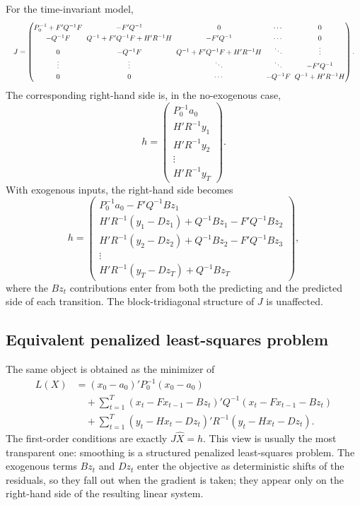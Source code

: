 \documentclass[11pt]{article}
\begin{document}
For the time-invariant model,
\begin{equation}
\resizebox{\textwidth}{!}{$
\renewcommand{\arraystretch}{1.25}
\setlength{\arraycolsep}{3pt}
J=\begin{pmatrix}
P_0^{-1}+F'Q^{-1}F & -F'Q^{-1} & 0 & \cdots & 0\\
-Q^{-1}F & Q^{-1}+F'Q^{-1}F+H'R^{-1}H & -F'Q^{-1} & \cdots & 0\\
0 & -Q^{-1}F & Q^{-1}+F'Q^{-1}F+H'R^{-1}H & \ddots & \vdots\\
\vdots & \vdots & \ddots & \ddots & -F'Q^{-1}\\
0 & 0 & \cdots & -Q^{-1}F & Q^{-1}+H'R^{-1}H
\end{pmatrix}.
$}
\end{equation}
The corresponding right-hand side is, in the no-exogenous case,
\begin{equation}
h=\begin{pmatrix}P_0^{-1}a_0\\ H'R^{-1}y_1\\ H'R^{-1}y_2\\ \vdots\\ H'R^{-1}y_T\end{pmatrix}.
\end{equation}
With exogenous inputs, the right-hand side becomes
\begin{equation}
h=\begin{pmatrix}P_0^{-1}a_0-F'Q^{-1}Bz_1\\[2pt]
H'R^{-1}(y_1-Dz_1)+Q^{-1}Bz_1-F'Q^{-1}Bz_2\\[2pt]
H'R^{-1}(y_2-Dz_2)+Q^{-1}Bz_2-F'Q^{-1}Bz_3\\[2pt]
\vdots\\[2pt]
H'R^{-1}(y_T-Dz_T)+Q^{-1}Bz_T\end{pmatrix},
\end{equation}
where the $Bz_t$ contributions enter from both the predicting and the
predicted side of each transition.  The block-tridiagonal structure of
$J$ is unaffected.

\subsection{Equivalent penalized least-squares problem}
\label{sec:penalized}

The same object is obtained as the minimizer of
\begin{align}
L(X)
&=(x_0-a_0)'P_0^{-1}(x_0-a_0)\\
&\quad+\sum_{t=1}^T (x_t-Fx_{t-1}-Bz_t)'Q^{-1}(x_t-Fx_{t-1}-Bz_t)\\
&\quad+\sum_{t=1}^T (y_t-Hx_t-Dz_t)'R^{-1}(y_t-Hx_t-Dz_t).
\end{align}
The first-order conditions are exactly $J\widehat X=h$.  This view is
usually the most transparent one: smoothing is a structured penalized
least-squares problem.  The exogenous terms $Bz_t$ and $Dz_t$ enter the
objective as deterministic shifts of the residuals, so they fall out
when the gradient is taken; they appear only on the right-hand side
of the resulting linear system.
\end{document}
